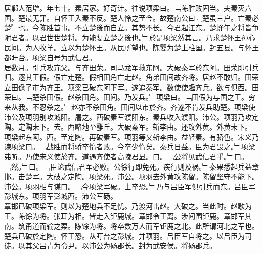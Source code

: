 \documentclass{zhvt-classic}
\begin{document}
\hspace*{2em}居鄛人范增。年七十。素居家。好奇计。往说项梁曰。﹁陈胜败固当。夫秦灭六国。楚最无罪。自怀王入秦不反。楚人怜之至今。故楚南公曰﹃楚虽三户。亡秦必楚﹄也。今陈胜首事。不立楚後而自立。其势不长。今君起江东。楚蜂午之将皆争附君者。以君世世楚将。为能复立楚之後也。﹂於是项梁然其言。乃求楚怀王孙心民间。为人牧羊。立以为楚怀王。从民所望也。陈婴为楚上柱国。封五县。与怀王都盱台。项梁自号为武信君。\\
\hspace*{2em}居数月。引兵攻亢父。与齐田荣。司马龙军救东阿。大破秦军於东阿。田荣即引兵归。逐其王假。假亡走楚。假相田角亡走赵。角弟田间故齐将。居赵不敢归。田荣立田儋子市为齐王。项梁已破东阿下军。遂追秦军。数使使趣齐兵。欲与俱西。田荣曰。﹁楚杀田假。赵杀田角。田间。乃发兵。﹂项梁曰。﹁田假为与国之王。穷来从我。不忍杀之。﹂赵亦不杀田角。田间以市於齐。齐遂不肯发兵助楚。项梁使沛公及项羽别攻城阳。屠之。西破秦军濮阳东。秦兵收入濮阳。沛公。项羽乃攻定陶。定陶未下。去。西略地至雝丘。大破秦军。斩李由。还攻外黄。外黄未下。\\
\hspace*{2em}项梁起东阿。西。至定陶。再破秦军。项羽等又斩李由。益轻秦。有骄色。宋义乃谏项梁曰。﹁战胜而将骄卒惰者败。今卒少惰矣。秦兵日益。臣为君畏之。﹂项梁弗听。乃使宋义使於齐。道遇齐使者高陵君显。曰。﹁公将见武信君乎。﹂曰。﹁然。﹂曰。﹁臣论武信君军必败。公徐行即免死。疾行则及祸。﹂秦果悉起兵益章邯。击楚军。大破之定陶。项梁死。沛公。项羽去外黄攻陈留。陈留坚守不能下。沛公。项羽相与谋曰。﹁今项梁军破。士卒恐。﹂乃与吕臣军俱引兵而东。吕臣军彭城东。项羽军彭城西。沛公军砀。\\
\hspace*{2em}章邯已破项梁军。则以为楚地兵不足忧。乃渡河击赵。大破之。当此时。赵歇为王。陈馀为将。张耳为相。皆走入钜鹿城。章邯令王离。涉间围钜鹿。章邯军其南。筑甬道而输之粟。陈馀为将。将卒数万人而军钜鹿之北。此所谓河北之军也。\\
\hspace*{2em}楚兵已破於定陶。怀王恐。从盱台之彭城。并项羽。吕臣军自将之。以吕臣为司徒。以其父吕青为令尹。以沛公为砀郡长。封为武安侯。将砀郡兵。\\
\end{document}
